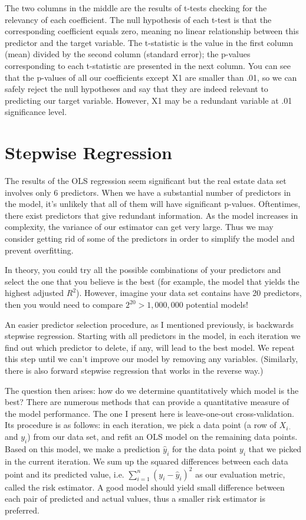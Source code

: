 \documentclass{article}
\begin{document}
The two columns in the middle are the results of t-tests checking for the relevancy of each coefficient. The null hypothesis of each t-test is that the corresponding coefficient equals zero, meaning no linear relationship between this predictor and the target variable. The t-statistic is the value in the first column (mean) divided by the second column (standard error); the p-values corresponding to each t-statistic are presented in the next column. You can see that the p-values of all our coefficients except X1 are smaller than .01, so we can safely reject the null hypotheses and say that they are indeed relevant to predicting our target variable. However, X1 may be a redundant variable at .01 significance level.

\section*{Stepwise Regression}
The results of the OLS regression seem significant but the real estate data set involves only 6 predictors. When we have a substantial number of predictors in the model, it's unlikely that all of them will have significant p-values. Oftentimes, there exist predictors that give redundant information. As the model increases in complexity, the variance of our estimator can get very large. Thus we may consider getting rid of some of the predictors in order to simplify the model and prevent overfitting.

In theory, you could try all the possible combinations of your predictors and select the one that you believe is the best (for example, the model that yields the highest adjusted $R^2$). However, imagine your data set contains have 20 predictors, then you would need to compare $2^{20} > 1,000,000$ potential models!

An easier predictor selection procedure, as I mentioned previously, is backwards stepwise regression. Starting with all predictors in the model, in each iteration we find out which predictor to delete, if any, will lead to the best model. We repeat this step until we can't improve our model by removing any variables. (Similarly, there is also forward stepwise regression that works in the reverse way.)

The question then arises: how do we determine quantitatively which model is the best? There are numerous methods that can provide a quantitative measure of the model performance. The one I present here is leave-one-out cross-validation. Its procedure is as follows: in each iteration, we pick a data point (a row of $X_{i\cdot}$ and $y_i$) from our data set, and refit an OLS model on the remaining data points. Based on this model, we make a prediction $\hat{y}_{i}$ for the data point $y_i$ that we picked in the current iteration. We sum up the squared differences between each data point and its predicted value, i.e. $\sum_{i=1}^{n} (y_i - \hat{y}_i)^2$ as our evaluation metric, called the risk estimator. A good model should yield small difference between each pair of predicted and actual values, thus a smaller risk estimator is preferred.
\end{document}
